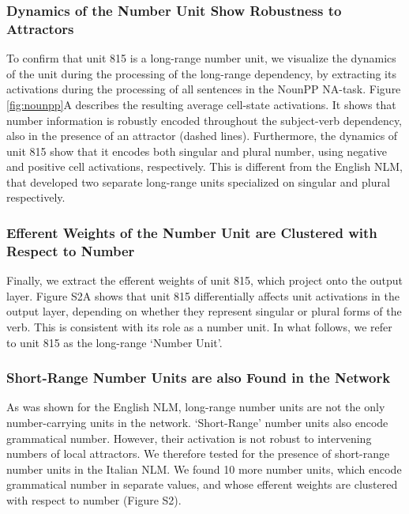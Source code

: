 \subsubsection{Dynamics of the Number Unit Show Robustness to Attractors} 
To confirm that unit 815 is a long-range number unit, we visualize the dynamics of the unit during the processing of the long-range dependency, by extracting its activations during the processing of all sentences in the NounPP NA-task. Figure \ref{fig:nounpp}A describes the resulting average cell-state activations. It shows that number information is robustly encoded throughout the subject-verb dependency, also in the presence of an attractor (dashed lines). Furthermore, the dynamics of unit 815 show that it encodes both singular and plural number, using negative and positive cell activations, respectively. This is different from the English NLM, that developed two separate long-range units specialized on singular and plural respectively.

\subsubsection{Efferent Weights of the Number Unit are Clustered with Respect to Number}
Finally, we extract the efferent weights of unit 815, which project onto the output layer. Figure S2A shows that unit 815 differentially affects unit activations in the output layer, depending on whether they represent singular or plural forms of the verb. This is consistent with its role as a number unit. In what follows, we refer to unit 815 as the long-range `Number Unit'.

\subsubsection{Short-Range Number Units are also Found in the Network}
As was shown for the English NLM, long-range number units are not the only number-carrying units in the network. `Short-Range' number units also encode grammatical number. However, their activation is not robust to intervening numbers of local attractors. We therefore tested for the presence of short-range number units in the Italian NLM. We found 10 more number units, which encode grammatical number in separate values, and whose efferent weights are clustered with respect to number (Figure S2).

